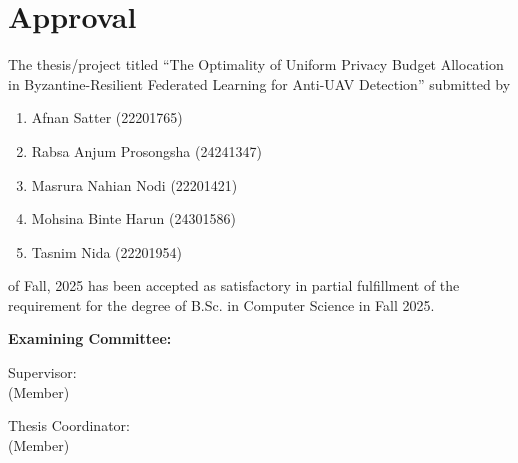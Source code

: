 \section*{Approval}

The thesis/project titled ``The Optimality of Uniform Privacy Budget Allocation
in Byzantine-Resilient Federated Learning for Anti-UAV Detection'' submitted by
\begin{enumerate}
  \item  Afnan Satter (22201765)
  \item Rabsa Anjum Prosongsha (24241347)
  \item Masrura Nahian Nodi (22201421)
  \item Mohsina Binte Harun (24301586)
  \item Tasnim Nida (22201954)
\end{enumerate}

of Fall, 2025 has been accepted as satisfactory in partial fulfillment of the requirement for the degree of B.Sc. in Computer Science in Fall 2025. 

\vspace{0.5cm}
\textbf{Examining Committee:}

\vspace{0.5cm}

Supervisor:\\
(Member)
\begin{center}
    \hspace{8.5cm}  \hspace{1cm} 
\end{center}



Thesis Coordinator:\\
(Member)
\begin{center}
    \hspace{8.5cm}  \hspace{1cm} 
\end{center}

